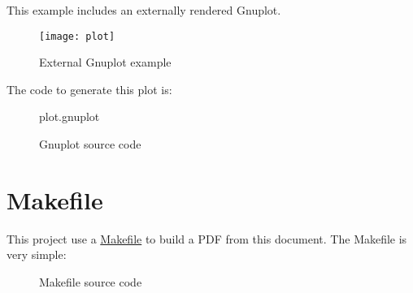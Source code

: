 \documentclass[11pt,a4paper]{article}
\begin{document}
This example includes an externally rendered Gnuplot.

\begin{figure}[h]
  \centering
  \texttt{[image: plot]}
  \caption{External Gnuplot example}
\end{figure}

The code to generate this plot is:
\lstset{basicstyle=\footnotesize\ttfamily}
\begin{figure}[h]
  \begin{lstinputlisting}[frame=single,language=Gnuplot,tabsize=2,numbers=left,numberstyle=\tiny]{plot.gnuplot}
  \end{lstinputlisting}
  \caption{Gnuplot source code}
\end{figure}

\pagebreak[4]

\section*{Makefile}

This project use a \href{https://www.gnu.org/software/make/}{Makefile} to build
a PDF from this document. The Makefile is very simple:

\begin{figure}[h]
  \lstset{basicstyle=\footnotesize\ttfamily}
  
  \caption{Makefile source code}
\end{figure}
\end{document}
